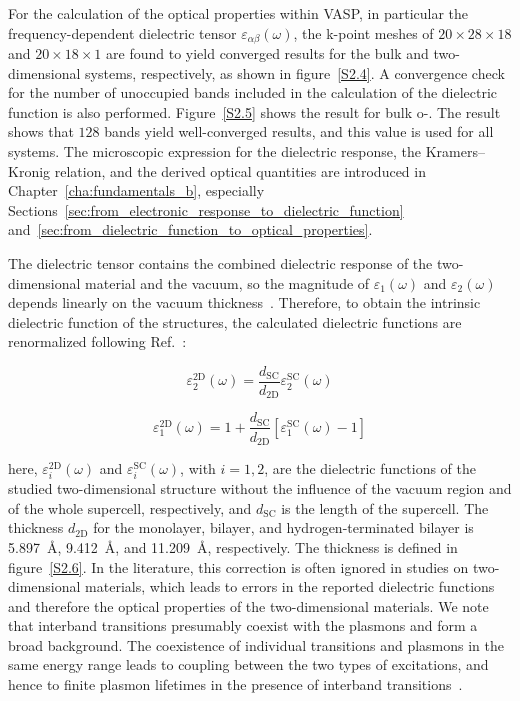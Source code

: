 For the calculation of the optical properties within VASP,
in particular the frequency-dependent dielectric tensor $\varepsilon_{\alpha\beta}(\omega)$,
the k-point meshes of $20 \times 28 \times 18$ and $20 \times 18 \times 1$ are found to yield converged results for the bulk and two-dimensional systems,
respectively, as shown in figure~\ref{S2.4}.
A convergence check for the number of unoccupied bands included in the calculation of the dielectric function is also performed.
Figure~\ref{S2.5} shows the result for bulk o-.
The result shows that $128$ bands yield well-converged results,
and this value is used for all systems.
The microscopic expression for the dielectric response,
the Kramers--Kronig relation,
and the derived optical quantities are introduced in Chapter~\ref{cha:fundamentals_b},
especially Sections~\ref{sec:from_electronic_response_to_dielectric_function} and~\ref{sec:from_dielectric_function_to_optical_properties}.

The dielectric tensor contains the combined dielectric response of the two-dimensional material and the vacuum,
so the magnitude of $\varepsilon_{1}(\omega)$ and $\varepsilon_{2}(\omega)$ depends linearly on the vacuum thickness~\cite{weng2018honeycomb,laturia2018dielectric}.
Therefore,
to obtain the intrinsic dielectric function of the structures,
the calculated dielectric functions are renormalized following Ref.~\cite{yang2021method}:

\begin{equation}
    \varepsilon_{2}^{\mathrm{2D}}(\omega)
    = \frac{d_{\mathrm{SC}}}{d_{\mathrm{2D}}}
    \varepsilon_{2}^{\mathrm{SC}}(\omega)
    \label{dielectric_vacuum_correction_imaginary}
\end{equation}

\begin{equation}
    \varepsilon_{1}^{\mathrm{2D}}(\omega) =
    1 + \frac{d_{\mathrm{SC}}}{d_{\mathrm{2D}}}
    \left[\varepsilon_{1}^{\mathrm{SC}}(\omega)-1\right]
    \label{dielectric_vacuum_correction_real}
\end{equation}

here, $\varepsilon_{i}^{\mathrm{2D}}(\omega)$ and $\varepsilon_{i}^{\mathrm{SC}}(\omega)$,
with $i=1,2$, are the dielectric functions of the studied two-dimensional structure without the influence of the vacuum region and of the whole supercell,
respectively, and $d_{\mathrm{SC}}$ is the length of the supercell.
The thickness $d_{\mathrm{2D}}$ for the monolayer, bilayer,
and hydrogen-terminated bilayer is \qty{5.897}{\angstrom},
\qty{9.412}{\angstrom}, and \qty{11.209}{\angstrom}, respectively.
The thickness is defined in figure~\ref{S2.6}.
In the literature, this correction is often ignored in studies on two-dimensional materials,
which leads to errors in the reported dielectric functions and therefore the optical properties of the two-dimensional materials.
We note that interband transitions presumably coexist with the plasmons and form a broad background.
The coexistence of individual transitions and plasmons in the same energy range leads to coupling between the two types of excitations,
and hence to finite plasmon lifetimes in the presence of interband transitions~\cite{li2017first}.

